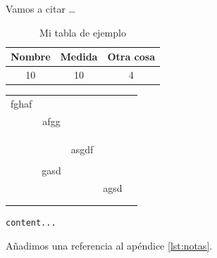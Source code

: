 Vamos a citar \ldots \cite{lorenzi2011inpainting}

\begin{table}[H]\caption{Mi tabla de ejemplo}\label{tab:ej}
	\begin{center}
		\begin{tabular}{c c c}
			Nombre & Medida & Otra cosa \\
			\hline
			10     & 10     & 4         \\
		\end{tabular}
	\end{center}
\end{table}


\begin{tabular}{|cc|c|c|c|}
	\hline
	fghaf &      &       &      & \\

	      & afgg &       &      & \\
	\hline
	\hline
	      &      &       &      & \\
	\hline
	      &      &       &      & \\
	\hline
	      &      &       &      & \\
	\hline
	      &      & asgdf &      & \\
	\hline
	      &      &       &      & \\
	\hline
	      & gasd &       &      & \\
	\hline
	      &      &       & agsd & \\
	\hline
	      &      &       &      & \\
	\hline
	      &      &       &      & \\
	\hline
\end{tabular}

\begin{lstlisting}[style=php, caption={izenburua}, label=lst:izena]
content...
\end{lstlisting}



Añadimos una referencia al apéndice \ref{lst:notas}.